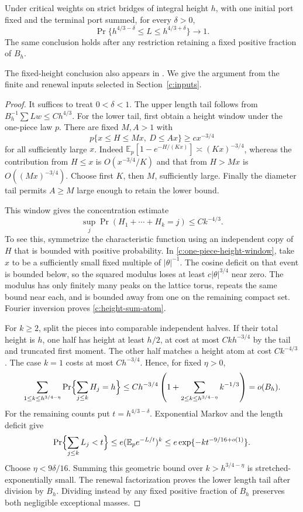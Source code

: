 \begin{lemma}\label{c:fixed-height-window}
Under critical weights on strict bridges of integral height $h$, with
one initial port fixed and the terminal port summed, for every $\delta>0$,
\[
 \Pr\{h^{4/3-\delta}\le L\le h^{4/3+\delta}\}\longrightarrow1.
\]
The same conclusion holds after any restriction retaining a fixed positive
fraction of $B_h$.
\end{lemma}
The fixed-height conclusion also appears in
\cite[Proposition 5.7]{Renewal}. We give the argument from the finite
and renewal inputs selected in Section~\ref{c:inputs}.
\begin{proof}
It suffices to treat $0<\delta<1$. The upper length tail follows from
$B_h^{-1}\sum Lw\le Ch^{4/3}$. For the lower tail, first obtain a
height window under the one-piece law $p$. There are fixed $M,A>1$ with
\begin{equation}\label{c:one-piece-height-window}
 p\{x\le H\le Mx,\ D\le Ax\}\ge cx^{-3/4}
\end{equation}
for all sufficiently large $x$. Indeed
$\mathbb E_p[1-e^{-H/(Kx)}]\asymp(Kx)^{-3/4}$, whereas the contribution
from $H\le x$ is $O(x^{-3/4}/K)$ and that from $H>Mx$ is
$O((Mx)^{-3/4})$. Choose first $K$, then $M$, sufficiently large.
Finally the diameter tail permits $A\ge M$ large enough to retain the
lower bound.

This window gives the concentration estimate
\begin{equation}\label{c:height-sum-atom}
 \sup_j\Pr(H_1+\cdots+H_k=j)\le Ck^{-4/3}.
\end{equation}
To see this, symmetrize the characteristic function using an independent
copy of $H$ that is bounded with positive probability. In
\eqref{c:one-piece-height-window}, take $x$ to be a sufficiently small
fixed multiple of $|\theta|^{-1}$. The cosine deficit on that event is
bounded below, so the squared modulus loses at least
$c|\theta|^{3/4}$ near zero. The modulus has only finitely many peaks
on the lattice torus, repeats the same bound near each, and is bounded
away from one on the remaining compact set. Fourier inversion proves
\eqref{c:height-sum-atom}.

For $k\ge2$, split the pieces into comparable independent halves.
If their total height is $h$, one half has height at least $h/2$, at
cost at most $Ckh^{-3/4}$ by the tail and truncated first moment.
The other half matches a height atom at cost $Ck^{-4/3}$. The case
$k=1$ costs at most $Ch^{-3/4}$. Hence, for fixed $\eta>0$,
\[
 \sum_{1\le k\le h^{3/4-\eta}}
 \Pr\Bigl\{\sum_{j\le k}H_j=h\Bigr\}
 \le Ch^{-3/4}\left(1+
       \sum_{2\le k\le h^{3/4-\eta}}k^{-1/3}\right)
 =o(B_h).
\]
For the remaining counts put $t=h^{4/3-\delta}$. Exponential Markov
and the length deficit give
\[
 \Pr\Bigl\{\sum_{j\le k}L_j<t\Bigr\}
 \le e(\mathbb E_p e^{-L/t})^k
 \le e\exp\{-k t^{-9/16+o(1)}\}.
\]
Choose $\eta<9\delta/16$. Summing this geometric bound over
$k>h^{3/4-\eta}$ is stretched-exponentially small. The renewal
factorization proves the lower length tail after division by $B_h$.
Dividing instead by any fixed positive fraction of $B_h$ preserves
both negligible exceptional masses.
\end{proof}

